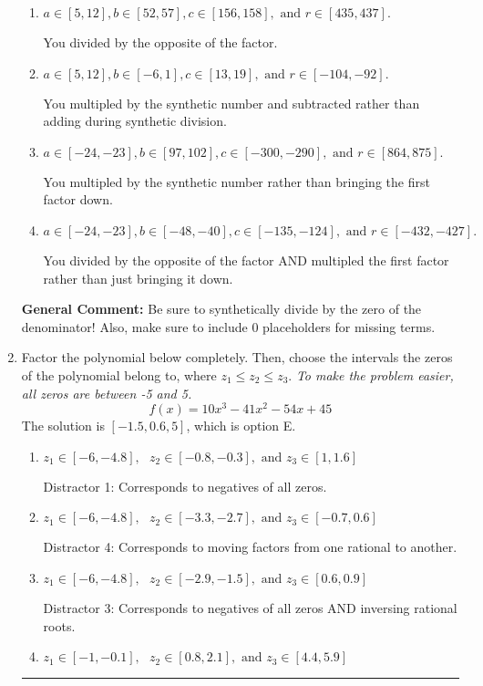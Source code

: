 \documentclass{extbook}[14pt]
\newcommand{\litem}[1]{\item #1

\rule{\textwidth}{0.4pt}}
\begin{document}
\begin{enumerate}
{\begin{enumerate}[label=\Alph*.]
* This is the solution!
\item \( a \in [5, 12], b \in [52, 57], c \in [156, 158], \text{ and } r \in [435, 437]. \)

 You divided by the opposite of the factor.
\item \( a \in [5, 12], b \in [-6, 1], c \in [13, 19], \text{ and } r \in [-104, -92]. \)

 You multipled by the synthetic number and subtracted rather than adding during synthetic division.
\item \( a \in [-24, -23], b \in [97, 102], c \in [-300, -290], \text{ and } r \in [864, 875]. \)

 You multipled by the synthetic number rather than bringing the first factor down.
\item \( a \in [-24, -23], b \in [-48, -40], c \in [-135, -124], \text{ and } r \in [-432, -427]. \)

 You divided by the opposite of the factor AND multipled the first factor rather than just bringing it down.
\end{enumerate}

\textbf{General Comment:} Be sure to synthetically divide by the zero of the denominator! Also, make sure to include 0 placeholders for missing terms.
}
\litem{
Factor the polynomial below completely. Then, choose the intervals the zeros of the polynomial belong to, where $z_1 \leq z_2 \leq z_3$. \textit{To make the problem easier, all zeros are between -5 and 5.}
\[ f(x) = 10x^{3} -41 x^{2} -54 x + 45 \]The solution is \( [-1.5, 0.6, 5] \), which is option E.\begin{enumerate}[label=\Alph*.]
\item \( z_1 \in [-6, -4.8], \text{   }  z_2 \in [-0.8, -0.3], \text{   and   } z_3 \in [1, 1.6] \)

 Distractor 1: Corresponds to negatives of all zeros.
\item \( z_1 \in [-6, -4.8], \text{   }  z_2 \in [-3.3, -2.7], \text{   and   } z_3 \in [-0.7, 0.6] \)

 Distractor 4: Corresponds to moving factors from one rational to another.
\item \( z_1 \in [-6, -4.8], \text{   }  z_2 \in [-2.9, -1.5], \text{   and   } z_3 \in [0.6, 0.9] \)

 Distractor 3: Corresponds to negatives of all zeros AND inversing rational roots.
\item \( z_1 \in [-1, -0.1], \text{   }  z_2 \in [0.8, 2.1], \text{   and   } z_3 \in [4.4, 5.9] \)


\end{enumerate}}
\end{enumerate}
\end{document}
